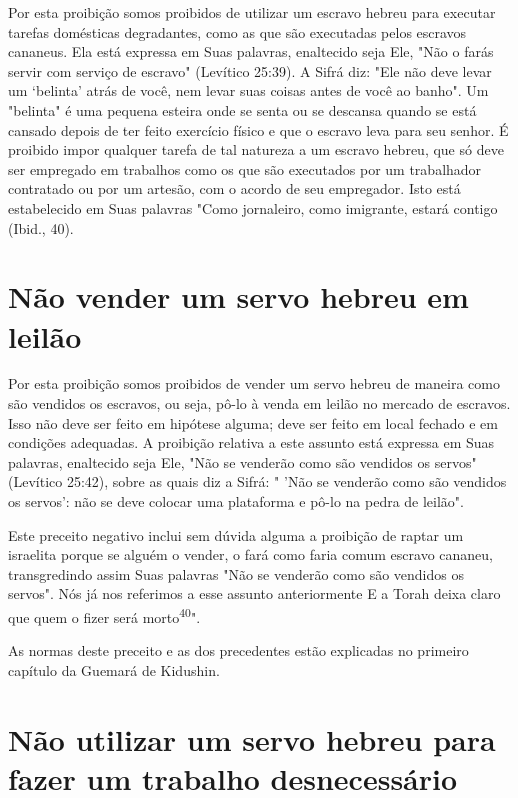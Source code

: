 \begin{itemize}
\begin{enumrate}
\begin{itemize}
\begin{itemize}
\begin{itemize}
Por esta proibição somos proibidos de utilizar um escravo hebreu para
executar tarefas domésticas degradantes, como as que são executadas
pe­los escravos cananeus. Ela está expressa em Suas palavras, enaltecido
seja Ele, "Não o farás servir com serviço de escravo" (Levítico 25:39).
A Sifrá diz: "Ele não deve levar um `belinta' atrás de você, nem levar
suas coisas antes de você ao banho". Um "belinta" é uma pequena esteira
onde se senta ou se descansa quando se está cansado depois de ter feito
exercício físico e que o escravo leva para seu senhor. É proibido impor
qualquer tarefa de tal natureza a um escravo hebreu, que só deve ser
empregado em trabalhos como os que são executados por um trabalhador
contratado ou por um artesão, com o acordo de seu em­pregador. Isto está
estabelecido em Suas palavras "Como jornaleiro, como imi­grante, estará
contigo (Ibid., 40).

\section{Não vender um servo hebreu em leilão}

Por esta proibição somos proibidos de vender um servo hebreu de maneira
como são vendidos os escravos, ou seja, pô-lo à venda em leilão no
mercado de escravos. Isso não deve ser feito em hipótese alguma; deve
ser fei­to em local fechado e em condições adequadas. A proibição
relativa a este as­sunto está expressa em Suas palavras, enaltecido seja
Ele, "Não se venderão co­mo são vendidos os servos" (Levítico 25:42),
sobre as quais diz a Sifrá: " 'Não se venderão como são vendidos os
servos': não se deve colocar uma platafor­ma e pô-lo na pedra de
leilão".

Este preceito negativo inclui sem dúvida alguma a proibição de rap­tar
um israelita porque se alguém o vender, o fará como faria comum escravo
cananeu, transgredindo assim Suas palavras "Não se venderão como são
vendi­dos os servos". Nós já nos referimos a esse assunto anteriormente
E a Torah deixa claro que quem o fizer será morto\textsuperscript{40}".

As normas deste preceito e as dos precedentes estão explicadas no
primeiro capítulo da Guemará de Kidushin.

\section{Não utilizar um servo hebreu para fazer um trabalho desnecessário}


\end{itemize}
\end{itemize}
\end{itemize}
\end{enumrate}
\end{itemize}
